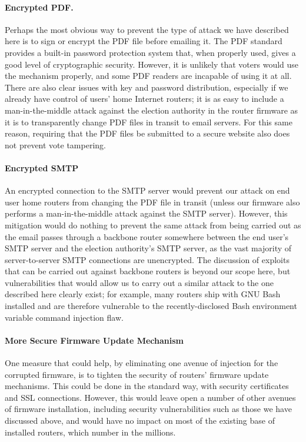 \documentclass{article}
\begin{document}
\paragraph{Encrypted PDF.}

Perhaps the most obvious way to prevent the type of attack we have
described here is to sign or encrypt the PDF file before emailing
it. The PDF standard provides a built-in password protection system
that, when properly used, gives a good level of cryptographic
security. However, it is unlikely that voters would use the mechanism
properly, and some PDF readers are incapable of using it at all. There
are also clear issues with key and password distribution, especially
if we already have control of users' home Internet routers; it is as
easy to include a man-in-the-middle attack against the election
authority in the router firmware as it is to transparently change PDF
files in transit to email servers. For this same reason, requiring
that the PDF files be submitted to a secure website also does not
prevent vote tampering.

\paragraph{Encrypted SMTP}

An encrypted connection to the SMTP server would prevent our attack on
end user home routers from changing the PDF file in transit (unless
our firmware also performs a man-in-the-middle attack against the SMTP
server). However, this mitigation would do nothing to prevent the same
attack from being carried out as the email passes through a backbone
router somewhere between the end user's SMTP server and the election
authority's SMTP server, as the vast majority of server-to-server SMTP
connections are unencrypted. The discussion of exploits that can be
carried out against backbone routers is beyond our scope here, but
vulnerabilities that would allow us to carry out a similar attack to
the one described here clearly exist; for example, many routers ship
with GNU Bash installed and are therefore vulnerable to the
recently-disclosed Bash environment variable command injection flaw.

\paragraph{More Secure Firmware Update Mechanism}

One measure that could help, by eliminating one avenue of injection
for the corrupted firmware, is to tighten the security of routers'
firmware update mechanisms. This could be done in the standard way,
with security certificates and SSL connections. However, this would
leave open a number of other avenues of firmware installation,
including security vulnerabilities such as those we have discussed
above, and would have no impact on most of the existing base of
installed routers, which number in the millions.
\end{document}
